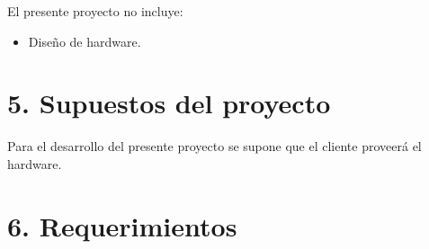 \documentclass[
11pt, %
codirector, %
]{charter}
\begin{document}
El presente proyecto no incluye:
\begin{itemize}
	\item Diseño de hardware.
\end{itemize}

%
%
%
%


\section{5. Supuestos del proyecto}
\label{sec:supuestos}

Para el desarrollo del presente proyecto se supone que el cliente proveerá el hardware.

%
%

\section{6. Requerimientos}
\label{sec:requerimientos}
\end{document}
